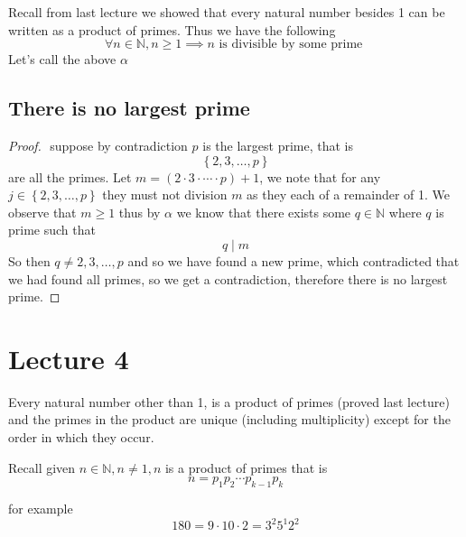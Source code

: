 \documentclass[11pt]{book}
\begin{document}
Recall from last lecture we showed that every natural number besides 1 can be written as a product of primes. Thus we have the following 
\[
\forall n \in \mathbb{N} , n \ge 1 \implies n \text{ is divisible by some prime } 
\]
Let's call the above $\alpha $ 


\section{There is no largest prime}%
\label{sec:there_is_no_largest_prime}

\begin{proof}
$ $\newline
    suppose by contradiction $p$ is the largest prime, that is 
    \[
    \left\{ 2, 3, \ldots , p \right\} 
    \]
    are all the primes.
    Let $m= \left( 2 \cdot 3 \cdot \dotsm  \cdot p \right)  + 1$,  we note that for any $j \in \left\{ 2, 3, \ldots ,p \right\} $ they must not division $m$ as they each of a remainder of 1. We observe that $m \ge 1$ thus by $\alpha $ we know that there exists some $q \in \mathbb{N} $ where $q$ is prime such that 
    \[
    q \mid m
    \]
    So then $q \neq 2, 3, \ldots ,p$ and so we have found a new prime, which contradicted that we had found all primes, so we get a contradiction, therefore there is no largest prime.
\end{proof}



\chapter{Lecture 4}%
\label{chp:lecture_4}

\begin{thm}\label{thm:fundamental_theorem_of_arithmetic}
    Every natural number other than 1, is a product of primes (proved last lecture) and the primes in the product are unique (including multiplicity)  except for the order in which they occur.
\end{thm}

Recall given $n\in \mathbb{N}, n \neq 1, n $ is a product of primes that is 
\[
n = p_1 p_2 \dotsb p_{k - 1} p_{k}
\]

for example 
\[
180 = 9 \cdot 10 \cdot 2= 3^{2} 5^{1} 2^{2} 
\]
\end{document}
